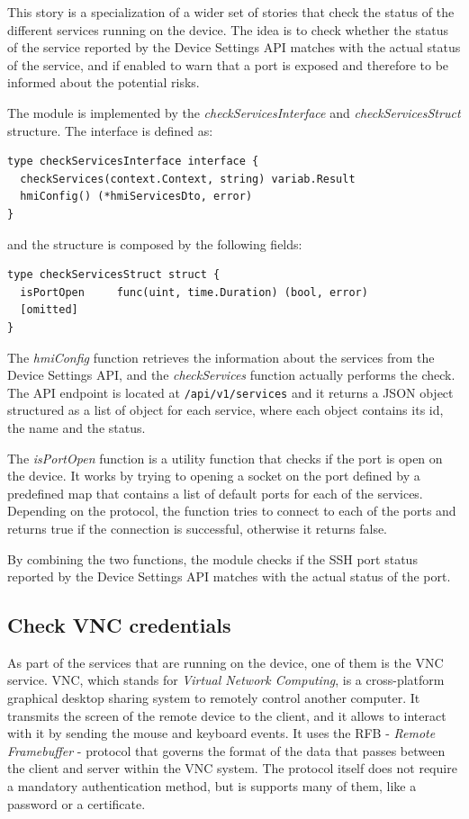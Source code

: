 This story is a specialization of a wider set of stories that check the status of the different services running on the device. The idea is to check whether the status of the service reported by the Device Settings API matches with the actual status of the service, and if enabled to warn that a port is exposed and therefore to be informed about the potential risks.

The module is implemented by the \textit{checkServicesInterface} and \textit{checkServicesStruct} structure. The interface is defined as:

\begin{lstlisting}[style=golang]
type checkServicesInterface interface {
  checkServices(context.Context, string) variab.Result
  hmiConfig() (*hmiServicesDto, error)
}
\end{lstlisting}

and the structure is composed by the following fields:

\begin{lstlisting}[style=golang]
type checkServicesStruct struct {
  isPortOpen     func(uint, time.Duration) (bool, error)
  [omitted]
}
\end{lstlisting}

The \textit{hmiConfig} function retrieves the information about the services from the Device Settings API, and the \textit{checkServices} function actually performs the check. The API endpoint is located at \texttt{/api/v1/services} and it returns a JSON object structured as a list of object for each service, where each object contains its id, the name and the status.

The \textit{isPortOpen} function is a utility function that checks if the port is open on the device. It works by trying to opening a socket on the port defined by a predefined map that contains a list of default ports for each of the services. Depending on the protocol, the function tries to connect to each of the ports and returns true if the connection is successful, otherwise it returns false.

By combining the two functions, the module checks if the SSH port status reported by the Device Settings API matches with the actual status of the port.

\subsection{Check VNC credentials}

As part of the services that are running on the device, one of them is the VNC service. VNC, which stands for \textit{Virtual Network Computing}, is a cross-platform graphical desktop sharing system to remotely control another computer. It transmits the screen of the remote device to the client, and it allows to interact with it by sending the mouse and keyboard events. It uses the RFB - \textit{Remote Framebuffer} - protocol that governs the format of the data that passes between the client and server within the VNC system. The protocol itself does not require a mandatory authentication method, but is supports many of them, like a password or a certificate.

